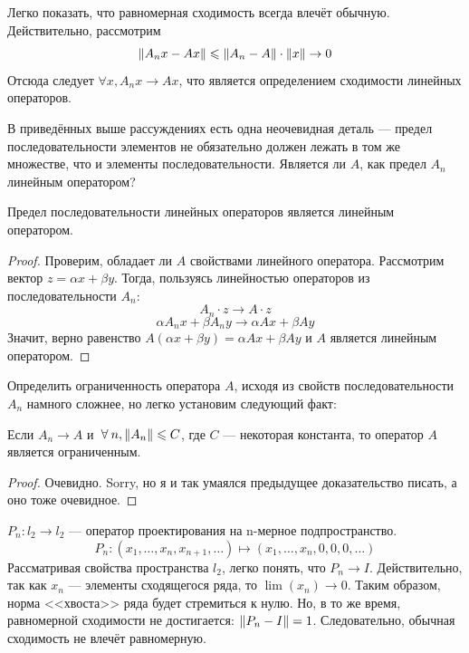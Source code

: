 	Легко показать, что равномерная сходимость всегда влечёт обычную. Действительно, рассмотрим
	$$\left\| A_n x - A x \right\| \leqslant \left\| A_n - A \right\| \cdot \left\| x \right\| \rightarrow 0$$
	Отсюда следует $\forall x, A_n x \rightarrow A x$, что является определением сходимости линейных операторов.
	
	В приведённых выше рассуждениях есть одна неочевидная деталь --- предел последовательности элементов не обязательно должен лежать
	в том же множестве, что и элементы последовательности. Является ли $A$, как предел $A_n$ линейным оператором?
	
	\begin{state}
		Предел последовательности линейных операторов является линейным оператором.
	\end{state}
	\begin{proof}
		Проверим, обладает ли $A$ свойствами линейного оператора. Рассмотрим вектор $z = \alpha x + \beta y$. Тогда, пользуясь линейностью
		операторов из последовательности $A_n$:
		$$ A_n \cdot z \rightarrow A \cdot z $$
		$$ \alpha A_n x + \beta A_n y \rightarrow \alpha A x + \beta A y $$
		Значит, верно равенство $A(\alpha x + \beta y) = \alpha A x + \beta A y$ и $A$ является линейным оператором.
	\end{proof}
	
	Определить ограниченность оператора $A$, исходя из свойств последовательности $A_n$ намного сложнее, но легко установим следующий
	факт:
	\begin{state}
		Если $A_n \rightarrow A$ и $\forall n, \norm{A_n} \leq C$, где $C$ --- некоторая константа, то оператор $A$ является ограниченным.
	\end{state} 
	\begin{proof}
		Очевидно. {\color{gray}Sorry, но я и так умаялся предыдущее доказательство писать, а оно тоже очевидное.}
	\end{proof}

	\example $P_n : l_2 \rightarrow l_2$ --- оператор проектирования на n-мерное подпространство.
	$$P_n : (x_1, \dots , x_n, x_{n+1}, \dots) \longmapsto (x_1, \dots, x_n, 0, 0, 0, \dots)$$
	Рассматривая свойства пространства $l_2$, легко понять, что $P_n \rightarrow I$. Действительно, так как $x_n$ --- элементы 
	сходящегося ряда, то $\lim (x_n) \rightarrow 0$. Таким образом, норма <<хвоста>> ряда будет стремиться к нулю.
	Но, в то же время, равномерной сходимости не достигается: $\left\| P_n - I \right\| = 1$. Следовательно, обычная сходимость не влечёт
	равномерную.
	
